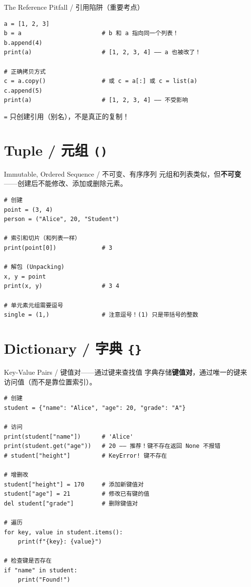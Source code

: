 \documentclass[11pt,a4paper]{report}
\let\oldtexttt\texttt
\renewcommand{\texttt}[1]{\textcolor{mainblue}{\oldtexttt{#1}}}
\begin{document}
\begin{warning}{The Reference Pitfall / 引用陷阱（重要考点）}
\begin{lstlisting}
a = [1, 2, 3]
b = a                       # b 和 a 指向同一个列表！
b.append(4)
print(a)                    # [1, 2, 3, 4] —— a 也被改了！

# 正确拷贝方式
c = a.copy()                # 或 c = a[:] 或 c = list(a)
c.append(5)
print(a)                    # [1, 2, 3, 4] —— 不受影响
\end{lstlisting}
\texttt{=} 只创建引用（别名），不是真正的复制！
\end{warning}

\section{Tuple / 元组 \texttt{()}}

\begin{concept}{Immutable, Ordered Sequence / 不可变、有序序列}
元组和列表类似，但\textbf{不可变}——创建后不能修改、添加或删除元素。
\begin{lstlisting}
# 创建
point = (3, 4)
person = ("Alice", 20, "Student")

# 索引和切片（和列表一样）
print(point[0])             # 3

# 解包 (Unpacking)
x, y = point
print(x, y)                 # 3 4

# 单元素元组需要逗号
single = (1,)               # 注意逗号！(1) 只是带括号的整数
\end{lstlisting}
\end{concept}

\section{Dictionary / 字典 \texttt{\{\}}}

\begin{concept}{Key-Value Pairs / 键值对——通过键来查找值}
字典存储\textbf{键值对}，通过唯一的键来访问值（而不是靠位置索引）。
\begin{lstlisting}
# 创建
student = {"name": "Alice", "age": 20, "grade": "A"}

# 访问
print(student["name"])      # 'Alice'
print(student.get("age"))   # 20 —— 推荐！键不存在返回 None 不报错
# student["height"]         # KeyError! 键不存在

# 增删改
student["height"] = 170     # 添加新键值对
student["age"] = 21         # 修改已有键的值
del student["grade"]        # 删除键值对

# 遍历
for key, value in student.items():
    print(f"{key}: {value}")

# 检查键是否存在
if "name" in student:
    print("Found!")
\end{lstlisting}
\end{concept}
\end{document}
